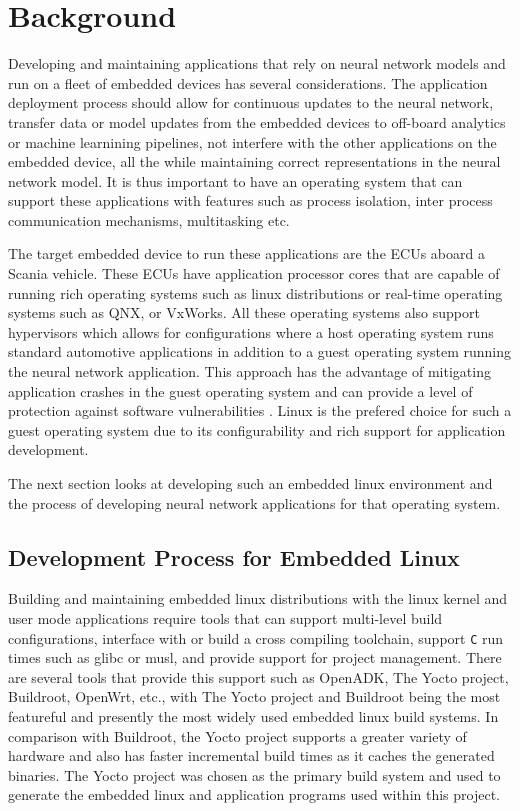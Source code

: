 
\chapter{Background}

Developing and maintaining applications that rely on neural network models and run on a fleet of embedded devices has several considerations. The application deployment process should allow for continuous updates to the neural network, transfer data or model updates from the embedded devices to off-board analytics or machine learnining pipelines, not interfere with the other applications on the embedded device, all the while maintaining correct representations in the neural network model. It is thus important to have an operating system that can support these applications with features such as process isolation, inter process communication mechanisms, multitasking etc.

The target embedded device to run these applications are the ECUs aboard a Scania vehicle. These ECUs have application processor cores that are capable of running rich operating systems such as linux distributions or real-time operating systems such as QNX, or VxWorks. All these operating systems also support hypervisors which allows for configurations where a host operating system runs standard automotive applications in addition to a guest operating system running the neural network application. This approach has the advantage of mitigating application crashes in the guest operating system and can provide a level of protection against software vulnerabilities \cite{linux-guest-os}. Linux is the prefered choice for such a guest operating system due to its configurability and rich support for application development.

The next section looks at developing such an embedded linux environment and the process of developing neural network applications for that operating system.

\section{Development Process for Embedded Linux}

Building and maintaining embedded linux distributions with the linux kernel and user mode applications require tools that can support multi-level build configurations, interface with or build a cross compiling toolchain, support \verb!C! run times such as glibc or musl, and provide support for project management. There are several tools that provide this support such as OpenADK, The Yocto project, Buildroot, OpenWrt, etc., with The Yocto project and Buildroot being the most featureful and presently the most widely used embedded linux build systems. In comparison with Buildroot, the Yocto project supports a greater variety of hardware and also has faster incremental build times as it caches the generated binaries. The Yocto project was chosen as the primary build system and used to generate the embedded linux and application programs used within this project.

